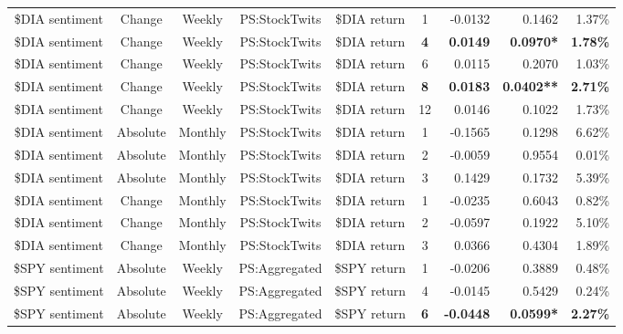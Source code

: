 \begin{longtable}{ccccccrrrrr}
    \$DIA sentiment & Change & Weekly & PS:StockTwits & \$DIA return & 1     & -0.0132 & \multicolumn{2}{r}{0.1462} & \multicolumn{2}{r}{1.37\%} \\
    \$DIA sentiment & Change & Weekly & PS:StockTwits & \$DIA return & \textbf{4} & \textbf{0.0149} & \multicolumn{2}{r}{\textbf{0.0970*}} & \multicolumn{2}{r}{\textbf{1.78\%}} \\
    \$DIA sentiment & Change & Weekly & PS:StockTwits & \$DIA return & 6     & 0.0115 & \multicolumn{2}{r}{0.2070} & \multicolumn{2}{r}{1.03\%} \\
    \$DIA sentiment & Change & Weekly & PS:StockTwits & \$DIA return & \textbf{8} & \textbf{0.0183} & \multicolumn{2}{r}{\textbf{0.0402**}} & \multicolumn{2}{r}{\textbf{2.71\%}} \\
    \$DIA sentiment & Change & Weekly & PS:StockTwits & \$DIA return & 12    & 0.0146 & \multicolumn{2}{r}{0.1022} & \multicolumn{2}{r}{1.73\%} \\
    \$DIA sentiment & Absolute & Monthly & PS:StockTwits & \$DIA return & 1     & -0.1565 & \multicolumn{2}{r}{0.1298} & \multicolumn{2}{r}{6.62\%} \\
    \$DIA sentiment & Absolute & Monthly & PS:StockTwits & \$DIA return & 2     & -0.0059 & \multicolumn{2}{r}{0.9554} & \multicolumn{2}{r}{0.01\%} \\
    \$DIA sentiment & Absolute & Monthly & PS:StockTwits & \$DIA return & 3     & 0.1429 & \multicolumn{2}{r}{0.1732} & \multicolumn{2}{r}{5.39\%} \\
    \$DIA sentiment & Change & Monthly & PS:StockTwits & \$DIA return & 1     & -0.0235 & \multicolumn{2}{r}{0.6043} & \multicolumn{2}{r}{0.82\%} \\
    \$DIA sentiment & Change & Monthly & PS:StockTwits & \$DIA return & 2     & -0.0597 & \multicolumn{2}{r}{0.1922} & \multicolumn{2}{r}{5.10\%} \\
    \$DIA sentiment & Change & Monthly & PS:StockTwits & \$DIA return & 3     & 0.0366 & \multicolumn{2}{r}{0.4304} & \multicolumn{2}{r}{1.89\%} \\
    \$SPY sentiment & Absolute & Weekly & PS:Aggregated & \$SPY return & 1     & -0.0206 & \multicolumn{2}{r}{0.3889} & \multicolumn{2}{r}{0.48\%} \\
    \$SPY sentiment & Absolute & Weekly & PS:Aggregated & \$SPY return & 4     & -0.0145 & \multicolumn{2}{r}{0.5429} & \multicolumn{2}{r}{0.24\%} \\
    \$SPY sentiment & Absolute & Weekly & PS:Aggregated & \$SPY return & \textbf{6} & \textbf{-0.0448} & \multicolumn{2}{r}{\textbf{0.0599*}} & \multicolumn{2}{r}{\textbf{2.27\%}} \\

\end{longtable}
